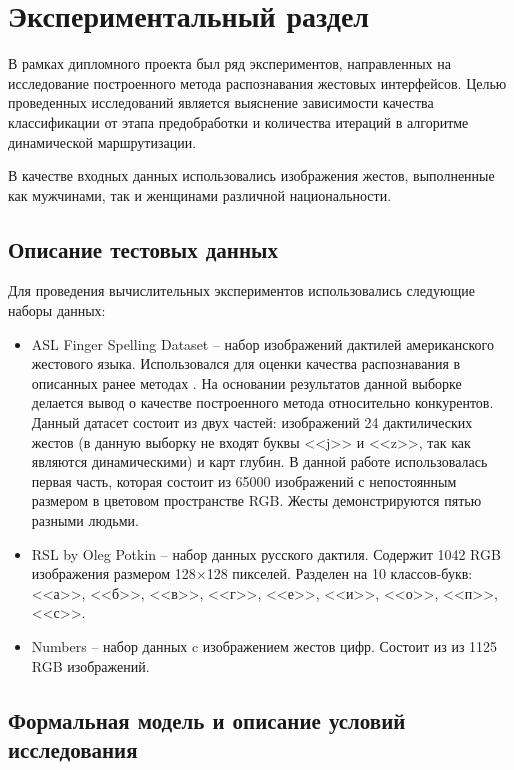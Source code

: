 \chapter{Экспериментальный раздел}
\label{cha:research}

В рамках дипломного проекта был ряд экспериментов, направленных на исследование построенного метода распознавания жестовых интерфейсов. Целью проведенных исследований является выяснение зависимости качества классификации от этапа предобработки и количества итераций в алгоритме динамической маршрутизации.

В качестве входных данных использовались изображения жестов, выполненные как мужчинами, так и женщинами различной национальности.

\section{Описание тестовых данных}

Для проведения вычислительных экспериментов использовались следующие наборы данных:

\begin{itemize}
	\item ASL Finger Spelling Dataset -- набор изображений дактилей американского жестового языка. Использовался для оценки качества распознавания в описанных ранее методах \cite{Karn,Starner,Garcia}. На основании результатов данной выборке делается вывод о качестве построенного метода относительно конкурентов. Данный датасет состоит из двух частей: изображений 24 дактилических жестов (в данную выборку не входят буквы <<j>> и <<z>>, так как являются динамическими) и карт глубин. В данной работе использовалась первая часть, которая состоит из 65000 изображений с непостоянным размером в цветовом пространстве RGB. Жесты демонстрируются пятью разными людьми.
	\item RSL by Oleg Potkin -- набор данных русского дактиля. Содержит 1042 RGB изображения размером 128$\times$128 пикселей. Разделен на 10 классов-букв: <<а>>, <<б>>, <<в>>, <<г>>, <<е>>, <<и>>, <<о>>, <<п>>, <<с>>.
	\item Numbers -- набор данных c изображением жестов цифр. Состоит из из 1125 RGB изображений.
\end{itemize}

\section{Формальная модель и описание условий исследования}

